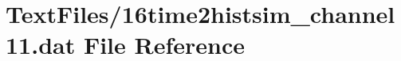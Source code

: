 \hypertarget{16time2histsim__channel11_8dat}{}\section{Text\+Files/16time2histsim\+\_\+channel11.dat File Reference}
\label{16time2histsim__channel11_8dat}
